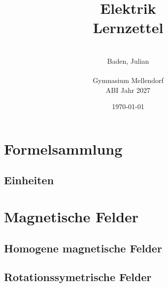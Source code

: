\documentclass[a4paper]{article}
\title{\Huge{Elektrik\\Lernzettel}}
\date{\today}
\author{\quad\\Baden, Julian\\\quad\\Gymnasium Mellendorf\\ABI Jahr 2027}
\begin{document}
\maketitle
\thispagestyle{empty}
\newpage
\tableofcontents \thispagestyle{empty}
\newpage
{}


\section{Formelsammlung}
\subsection{Einheiten}



\newpage


\section{Magnetische Felder}
\subsection{Homogene magnetische Felder}






\subsection{Rotationssymetrische Felder}







\subsection{}
\end{document}
